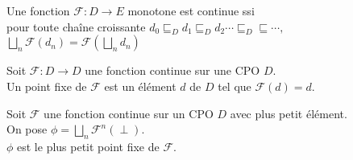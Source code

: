 \documentclass[10pt,a4paper]{article}
\begin{document}
\begin{definition}[Continuité] Une fonction $\mathcal{F} : D \to E$ monotone est continue ssi\\ pour toute chaîne croissante $d_0 \sqsubseteq_D d_1 \sqsubseteq_D d_2 \cdots  \sqsubseteq_D \sqsubseteq \cdots ,$\\
\indent$\displaystyle\bigsqcup_n \mathcal{F} (d_n) = \mathcal{F}( \bigsqcup_n d_n)$
\end{definition}

\begin{definition}
 Soit $\mathcal{F} : D \to D$ une fonction continue sur une CPO $D$.\\
 Un point fixe de $\mathcal{F}$ est un élément $d$ de $D$ tel que $\mathcal{F}(d) = d$.
\end{definition}

\begin{thm}[Kleene]
 Soit $\mathcal{F}$ une fonction continue sur un CPO $D$ avec plus petit élément. \\
On pose  $\displaystyle\phi = \bigsqcup_n \mathcal{F}^n(\perp).$\\
$\phi$ est le plus petit point fixe de $\mathcal{F}$.
\end{thm}
\end{document}

